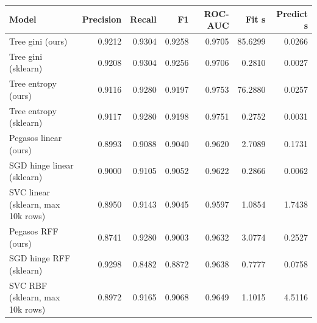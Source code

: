 \begin{tabular}{lrrrrrr}
\toprule
Model & Precision & Recall & F1 & ROC-AUC & Fit s & Predict s \\
\midrule
Tree gini (ours) & 0.9212 & 0.9304 & 0.9258 & 0.9705 & 85.6299 & 0.0266 \\
Tree gini (sklearn) & 0.9208 & 0.9304 & 0.9256 & 0.9706 & 0.2810 & 0.0027 \\
Tree entropy (ours) & 0.9116 & 0.9280 & 0.9197 & 0.9753 & 76.2880 & 0.0257 \\
Tree entropy (sklearn) & 0.9117 & 0.9280 & 0.9198 & 0.9751 & 0.2752 & 0.0031 \\
Pegasos linear (ours) & 0.8993 & 0.9088 & 0.9040 & 0.9620 & 2.7089 & 0.1731 \\
SGD hinge linear (sklearn) & 0.9000 & 0.9105 & 0.9052 & 0.9622 & 0.2866 & 0.0062 \\
SVC linear (sklearn, max 10k rows) & 0.8950 & 0.9143 & 0.9045 & 0.9597 & 1.0854 & 1.7438 \\
Pegasos RFF (ours) & 0.8741 & 0.9280 & 0.9003 & 0.9632 & 3.0774 & 0.2527 \\
SGD hinge RFF (sklearn) & 0.9298 & 0.8482 & 0.8872 & 0.9638 & 0.7777 & 0.0758 \\
SVC RBF (sklearn, max 10k rows) & 0.8972 & 0.9165 & 0.9068 & 0.9649 & 1.1015 & 4.5116 \\
\bottomrule
\end{tabular}
